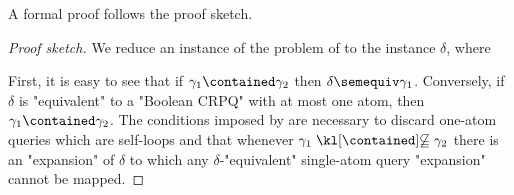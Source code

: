 A formal proof follows the proof sketch.
\begin{proof}[Proof sketch]
	We reduce an instance of the problem of  to the instance
	$\delta$, where
	\begin{center}
    \end{center}
	First, it is easy to see that if $\gamma_1 \contained \gamma_2$ then $\delta \semequiv \gamma_1$. Conversely, if $\delta$ is "equivalent" to a "Boolean CRPQ" with at most one atom, then $\gamma_1 \contained \gamma_2$.
	The conditions imposed by  are necessary to discard one-atom queries which are self-loops and that whenever  $\gamma_1 \notcontained \gamma_2$ there is an "expansion" of $\delta$ to which any $\delta$-"equivalent" single-atom query "expansion" cannot be mapped.
\end{proof}

